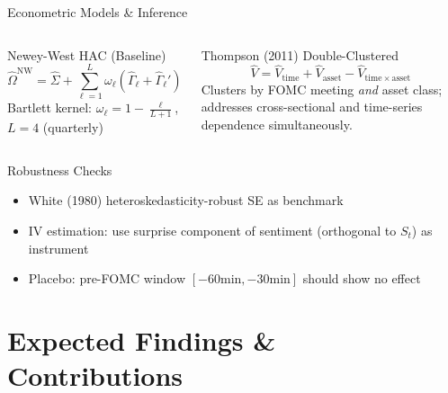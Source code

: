 \documentclass[aspectratio=169, 11pt]{beamer}
\begin{document}
\begin{frame}{Econometric Models \& Inference}
  \begin{columns}[T]
    \begin{ablock}{Newey-West HAC (Baseline)}
      \begin{equation*}
        \hat{\Omega}^{\mathrm{NW}} = \hat{\Sigma} + \sum_{\ell=1}^{L} \omega_\ell \left(\hat{\Gamma}_\ell + \hat{\Gamma}_\ell'\right)
      \end{equation*}
      \footnotesize
      Bartlett kernel: $\omega_\ell = 1 - \frac{\ell}{L+1}$, $L = 4$ (quarterly)
    \end{ablock}

    \begin{aalertblock}{Thompson (2011) Double-Clustered}
      \begin{equation*}
        \hat{V} = \hat{V}_{\mathrm{time}} + \hat{V}_{\mathrm{asset}} - \hat{V}_{\mathrm{time \times asset}}
      \end{equation*}
      \footnotesize
      Clusters by FOMC meeting \emph{and} asset class; addresses cross-sectional and time-series dependence simultaneously.
    \end{aalertblock}
  \end{columns}

  \vspace{0.4em}
  \begin{agreenblock}{Robustness Checks}
    \footnotesize
    \begin{itemize}
      \item White (1980) heteroskedasticity-robust SE as benchmark
      \item IV estimation: use surprise component of sentiment (orthogonal to $S_t$) as instrument
      \item Placebo: pre-FOMC window $[-60\mathrm{min}, -30\mathrm{min}]$ should show \alert{no effect}
    \end{itemize}
  \end{agreenblock}
\end{frame}

\section{Expected Findings \& Contributions}
\end{document}
